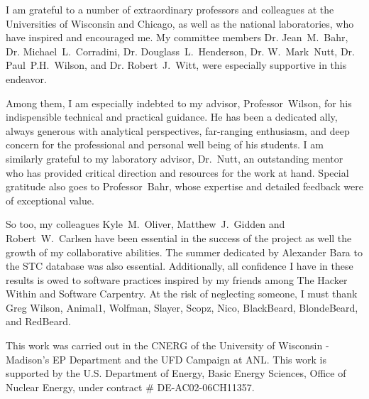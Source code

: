 I am grateful to a number of extraordinary professors and colleagues at the 
Universities of Wisconsin and Chicago, as well as the national laboratories, 
who have inspired and encouraged me. My committee members Dr. Jean~M.~Bahr, Dr.  
Michael~L.~Corradini, Dr. Douglass~L.~Henderson, Dr. W.~Mark~Nutt, Dr.  
Paul~P.H.~Wilson, and Dr. Robert~J.~Witt, were especially supportive in this 
endeavor.  

Among them, I am especially indebted to my advisor, Professor~Wilson, 
for his indispensible technical and practical guidance. He has been a dedicated 
ally, always generous with analytical perspectives, far-ranging enthusiasm, 
and deep concern for the professional and personal well being of his 
students. I am similarly grateful to my laboratory advisor, Dr.~Nutt, an 
outstanding mentor who has provided critical direction and resources for the 
work at hand. Special gratitude also goes to Professor~Bahr, whose 
expertise and detailed feedback were of exceptional value.  

So too, my colleagues Kyle~M.~Oliver, Matthew~J.~Gidden and Robert~W.~Carlsen 
have been essential in the success of the \Cyclus project as well the growth of 
my collaborative abilities. The summer dedicated by Alexander Bara to the STC 
database was also essential. Additionally, all confidence I have in 
these results is owed to software practices inspired by my friends among The 
Hacker Within and Software Carpentry. At the risk of neglecting someone, I must 
thank Greg Wilson, Animal1, Wolfman, Slayer, Scopz, Nico,  BlackBeard, 
BlondeBeard, and RedBeard.

This work was carried out in the \gls{CNERG} of the University of Wisconsin - 
Madison's \gls{EP} Department and the \gls{UFD} Campaign at \gls{ANL}. This 
work is supported by the U.S. Department of Energy, Basic Energy Sciences, 
Office of Nuclear Energy, under contract \# DE-AC02-06CH11357.
